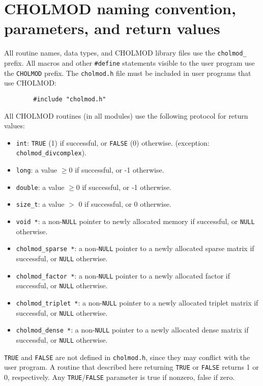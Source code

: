 \documentclass[11pt]{article}
\begin{document}
\newpage \section{CHOLMOD naming convention, parameters, and return values}

All routine names, data types, and CHOLMOD library files use the
{\tt cholmod\_} prefix.  All macros and other {\tt \#define} statements
visible to the user program use the {\tt CHOLMOD} prefix.
The {\tt cholmod.h} file must be included in user programs that use CHOLMOD:

{\footnotesize
\begin{verbatim}
        #include "cholmod.h"
\end{verbatim}
}

\noindent
All CHOLMOD routines (in all modules) use the following protocol for return values:
\begin{itemize}
\item {\tt int}: {\tt TRUE} (1) if successful, or {\tt FALSE} (0) otherwise. (exception: {\tt cholmod\_divcomplex}).
\item {\tt long}: a value $\ge 0$ if successful, or -1 otherwise.
\item {\tt double}: a value $\ge 0$ if successful, or -1 otherwise.
\item {\tt size\_t}: a value $>$ 0 if successful, or 0 otherwise.
\item {\tt void *}: a non-{\tt NULL} pointer to newly allocated memory if successful, or {\tt NULL} otherwise.
\item {\tt cholmod\_sparse *}:  a non-{\tt NULL} pointer to a newly allocated sparse matrix if successful, or {\tt NULL} otherwise.
\item {\tt cholmod\_factor *}:  a non-{\tt NULL} pointer to a newly allocated factor if successful, or {\tt NULL} otherwise.
\item {\tt cholmod\_triplet *}: a non-{\tt NULL} pointer to a newly allocated triplet matrix if successful, or {\tt NULL} otherwise.
\item {\tt cholmod\_dense *}:   a non-{\tt NULL} pointer to a newly allocated dense matrix if successful, or {\tt NULL} otherwise.
\end{itemize}

{\tt TRUE} and {\tt FALSE} are not defined in {\tt cholmod.h},
since they may conflict with the user program.  A routine that described
here returning {\tt TRUE} or {\tt FALSE} returns 1 or 0, respectively.
Any {\tt TRUE}/{\tt FALSE} parameter is true if nonzero, false if zero.
\end{document}
